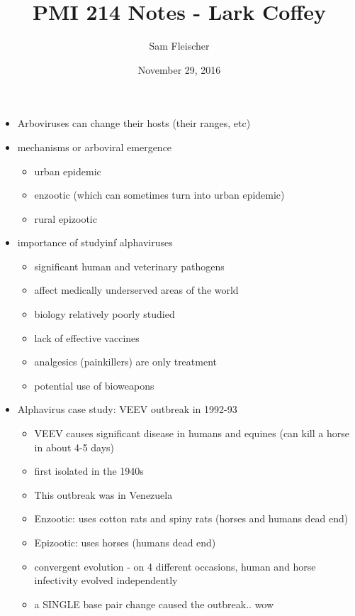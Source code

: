 \documentclass{article}
\title{PMI 214 Notes - Lark Coffey}
\author{Sam Fleischer}
\date{November 29, 2016}
\begin{document}
    \maketitle

    \begin{itemize}
        \item Arboviruses can change their hosts (their ranges, etc)
        \item mechanisms or arboviral emergence
        \begin{itemize}
            \item urban epidemic
            \item enzootic (which can sometimes turn into urban epidemic)
            \item rural epizootic
        \end{itemize}
        \item importance of studyinf alphaviruses
        \begin{itemize}
            \item significant human and veterinary pathogens
            \item affect medically underserved areas of the world
            \item biology relatively poorly studied
            \item lack of effective vaccines
            \item analgesics (painkillers) are only treatment
            \item potential use of bioweapons
        \end{itemize}
        \item Alphavirus case study: VEEV outbreak in 1992-93
        \begin{itemize}
            \item VEEV causes significant disease in humans and equines (can kill a horse in about 4-5 days)
            \item first isolated in the 1940s
            \item This outbreak was in Venezuela
            \item Enzootic: uses cotton rats and spiny rats (horses and humans dead end)
            \item Epizootic: uses horses (humans dead end)
            \item convergent evolution - on 4 different occasions, human and horse infectivity evolved independently
            \item a SINGLE base pair change caused the outbreak.. wow

\end{itemize}
\end{itemize}
\end{document}

